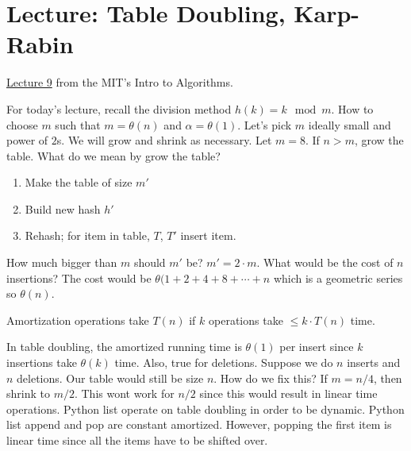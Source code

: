 \chapter{Lecture: Table Doubling, Karp-Rabin}
\href{https://ocw.mit.edu/courses/electrical-engineering-and-computer-science/6-006-introduction-to-algorithms-fall-2011/lecture-videos/lecture-9-table-doubling-karp-rabin/}{Lecture 9} 
from the MIT's  Intro to Algorithms.

For today's lecture, recall the division method \(h(k) = k \mod m\). How to choose \(m\) such that 
\(m = \theta(n)\) and \(\alpha = \theta(1)\). Let's pick \(m\) ideally small and power of \(2\)s. We will grow
and shrink as necessary. Let \(m = 8\). If \(n > m\), grow the table. What do we mean by grow the table?
\begin{enumerate}
	\item Make the table of size \(m'\)
	\item Build new hash \(h'\)
	\item Rehash; for item in table, \(T\), \(T'\) insert item.
\end{enumerate}
How much bigger than \(m\) should \(m'\) be? \(m' = 2\cdot m\). What would be the cost of \(n\) insertions?
The cost would be \(\theta(1 + 2 + 4 + 8 + \cdots + n\) which is a geometric series so \(\theta(n)\).
\begin{definition}
	Amortization operations take \(T(n)\) if \(k\) operations take \(\leq k\cdot T(n)\) time.
\end{definition}
\noindent
In table doubling, the amortized running time is \(\theta(1)\) per insert since \(k\) insertions take \(\theta(k)\)
time. Also, true for deletions. Suppose we do \(n\) inserts and \(n\) deletions. Our table would still be size 
\(n\). How do we fix this? If \(m = n / 4\), then shrink to \(m / 2\). This wont work for \(n / 2\) since this would
result in linear time operations. Python list operate on table doubling in order to be dynamic. Python list
append and pop are constant amortized. However, popping the first item is linear time since all the items
have to be shifted over.

